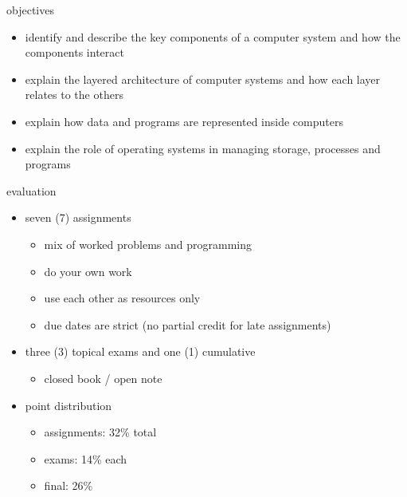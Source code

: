 \documentclass[10pt,t,usenames,dvipsnames]{beamer}
\begin{document}
  \begin{frame}{objectives}
    \begin{itemize}[itemsep=10pt]
      \item identify and describe the key components of a computer system and
        how the components interact
      \item explain the layered architecture of computer systems and how each
        layer relates to the others
      \item explain how data and programs are represented inside computers
      \item explain the role of operating systems in managing storage, processes
        and programs
    \end{itemize}
  \end{frame}

  \begin{frame}{evaluation}
    \begin{itemize}[itemsep=10pt]
      \item seven (7) assignments
        \begin{itemize}[label=\cdot]
          \item mix of worked problems and programming
          \item do your own work
          \item use each other as resources only
          \item due dates are strict (no partial credit for late assignments)
        \end{itemize}
      \item three (3) topical exams and one (1) cumulative
        \begin{itemize}[label=\cdot]
          \item closed book / open note
        \end{itemize}
      \item point distribution
        \begin{itemize}
          \item assignments: 32\% total
          \item exams: 14\% each
          \item final: 26\%
        \end{itemize}
    \end{itemize}

  \end{frame}
\end{document}
